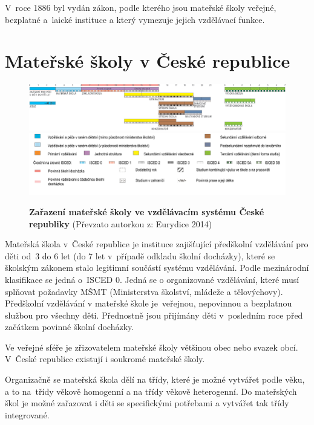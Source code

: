		V roce 1886 byl vydán zákon, podle kterého jsou mateřské školy veřejné, bezplatné a laické instituce a který vymezuje jejich vzdělávací funkce.



	\section{Mateřské školy v České republice}

\begin{figure} [h!]
			\includegraphics[width=1.0\linewidth]{fotky/msCR.png} \\
			\includegraphics[width=1.0\linewidth]{fotky/msVysvetlivky.png}
			\caption{ \textbf{Zařazení mateřské školy ve vzdělávacím systému České republiky}
			(Převzato autorkou z: Eurydice 2014)
			}
			\label{obr:msCR}
		\end{figure}

		Mateřská škola v České republice je instituce zajišťující předškolní vzdělávání pro děti od 3 do 6 let (do 7 let v případě odkladu školní docházky), které se školským zákonem stalo legitimní součástí systému vzdělávání. Podle mezinárodní klasifikace se jedná o ISCED 0. Jedná se o organizované vzdělávání, které musí splňovat požadavky MŠMT (Ministerstva školství, mládeže a tělovýchovy). Předškolní vzdělávání v mateřské škole je veřejnou, nepovinnou a bezplatnou službou pro všechny děti. Přednostně jsou přijímány děti v posledním roce před začátkem povinné školní docházky. 

		

		Ve veřejné sféře je zřizovatelem mateřské školy většinou obec nebo svazek obcí. V České republice existují i soukromé mateřské školy.

		Organizačně se mateřská škola dělí na třídy, které je možné vytvářet podle věku, a to na třídy věkově homogenní a na třídy věkově heterogenní. Do mateřských škol je možné zařazovat i děti se specifickými potřebami a vytvářet tak třídy integrované. 

